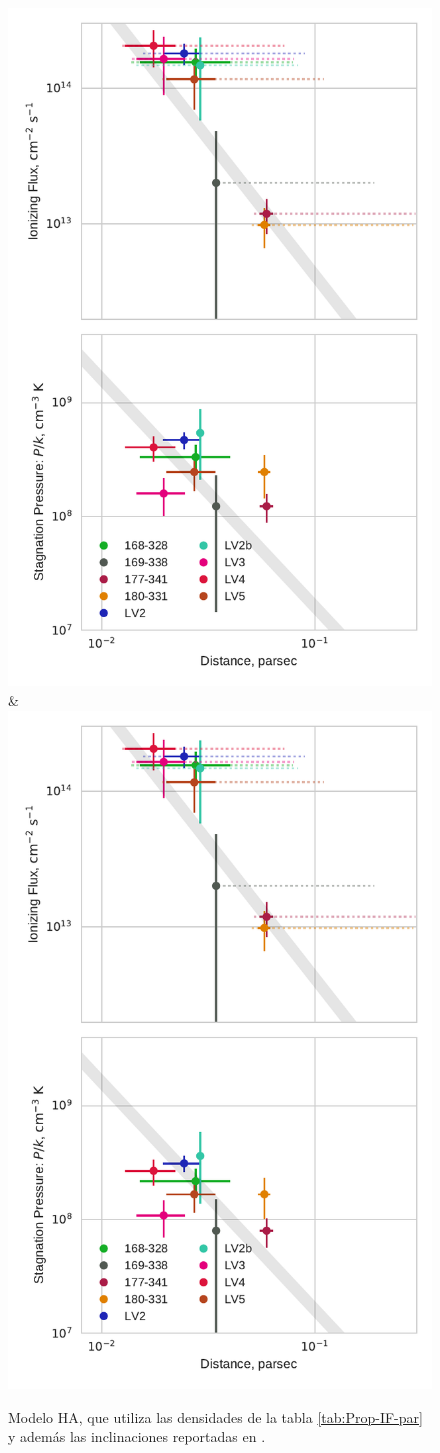 \begin{figure}
    \ContinuedFloat
    \captionsetup{list=off, format=cont}
    \includegraphics[width=0.5\linewidth]{./Figures/plot-wind-fits-HA98} & \includegraphics[width=0.5\linewidth]{./Figures/plot-wind-fits-HA98-2}
    \caption{Modelo HA, que utiliza las densidades de la tabla \ref{tab:Prop-IF-par} y además las inclinaciones reportadas en \citet{HA:1998}.}
\end{figure}



